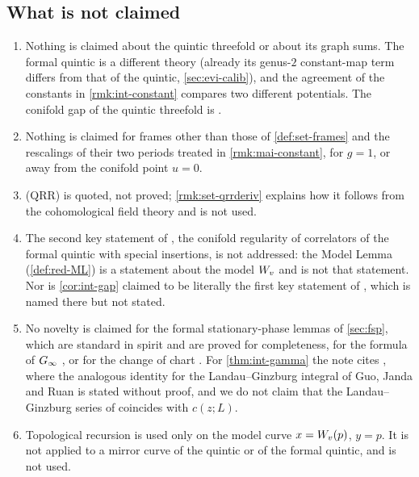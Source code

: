 \subsection{What is not claimed}
\label{sec:int-notclaimed}

\begin{enumerate}
\item Nothing is claimed about the quintic threefold or about its graph sums. The formal quintic is a different theory (already its genus-$2$ constant-map term differs from that of the quintic, \cref{sec:evi-calib}), and the agreement of the constants in \cref{rmk:int-constant} compares two different potentials. The conifold gap of the quintic threefold is \cite[Theorem~2]{CGYZ26}.
\item Nothing is claimed for frames other than those of \cref{def:set-frames} and the rescalings of their two periods treated in \cref{rmk:mai-constant}, for $g=1$, or away from the conifold point $u=0$.
\item (QRR) is quoted, not proved; \cref{rmk:set-qrrderiv} explains how it follows from the cohomological field theory and is not used.
\item The second key statement of \cite[Remark~1.9]{CGYZ26}, the conifold regularity of correlators of the formal quintic with special insertions, is not addressed: the Model Lemma (\cref{def:red-ML}) is a statement about the model $W_{v}$ and is not that statement. Nor is \cref{cor:int-gap} claimed to be literally the first key statement of \cite[Remark~1.9]{CGYZ26}, which is named there but not stated.
\item No novelty is claimed for the formal stationary-phase lemmas of \cref{sec:fsp}, which are standard in spirit and are proved for completeness, for the formula of $G_{\infty}$ \cite[Lemma~7.7, (37)]{GJR18}, or for the change of chart \cite[\S10]{MR1901075}. For \cref{thm:int-gamma} the note cites \cite[Remark~7.2]{GJR18}, where the analogous identity for the Landau--Ginzburg integral of Guo, Janda and Ruan is stated without proof, and we do not claim that the Landau--Ginzburg series of \cite{GJR18} coincides with $c(z;L)$.
\item Topological recursion is used only on the model curve $x=W_{v}(p)$, $y=p$. It is not applied to a mirror curve of the quintic or of the formal quintic, and \cite{FCCZ26} is not used.
\end{enumerate}

